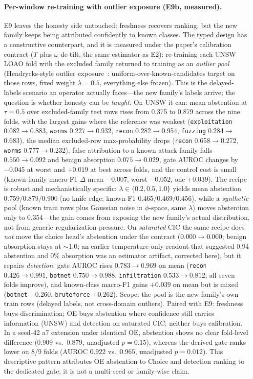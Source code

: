\documentclass[sigconf,anonymous=false]{acmart}
\begin{document}
\paragraph{Per-window re-training with outlier exposure (E9b, measured).} E9 leaves the honesty side untouched: freshness recovers ranking, but the new family keeps being attributed confidently to known classes. The typed design has a constructive counterpart, and it is measured under the paper's calibration contract ($T$ plus $\omega$ de-tilt, the same estimator as E2): re-training each UNSW LOAO fold with the excluded family returned to training as an \emph{outlier pool} (Hendrycks-style outlier exposure~\cite{hendrycks2019oe}: uniform-over-known-candidates target on those rows, fixed weight $\lambda{=}0.5$, everything else frozen). This is the delayed-labels scenario an operator actually faces---the new family's labels arrive; the question is whether honesty can be \emph{taught}. On UNSW it can: mean abstention at $\tau{=}0.5$ over excluded-family test rows rises from 0.375 to 0.879 across the nine folds, with the largest gains where the reference was weakest (\texttt{exploitation} 0.082$\to$0.883, \texttt{worms} 0.227$\to$0.932, \texttt{recon} 0.282$\to$0.954, \texttt{fuzzing} 0.284$\to$0.683), the median excluded-row max-probability drops (\texttt{recon} 0.658$\to$0.272, \texttt{worms} 0.777$\to$0.232), false attribution to a known attack family falls $0.550\to0.092$ and benign absorption $0.075\to0.029$, gate AUROC changes by $-0.045$ at worst and $+0.019$ at best across folds, and the control cost is small (known-family macro-F1 $\Delta$ mean $-0.007$, worst $-0.052$, one $+0.039$). The recipe is robust and mechanistically specific: $\lambda\in\{0.2,0.5,1.0\}$ yields mean abstention $0.759/0.879/0.900$ (no knife edge; known-F1 $0.465/0.469/0.456$), while a \emph{synthetic} pool (known train rows plus Gaussian noise in $\phi$-space, same $\lambda$) moves abstention only to 0.354---the gain comes from exposing the new family's actual distribution, not from generic regularization pressure. On \emph{saturated} CIC the same recipe does \emph{not} move the choice head's abstention under the contract ($0.000\to0.000$; benign absorption stays at $\sim$1.0; an earlier temperature-only readout that suggested 0.94 abstention and 0\% absorption was an estimator artifact, corrected here), but it repairs \emph{detection}: gate AUROC rises $0.783\to0.969$ on mean (\texttt{recon} $0.426\to0.991$, \texttt{botnet} $0.750\to0.988$, \texttt{infiltration} $0.533\to0.812$; all seven folds improve), and known-class macro-F1 gains $+0.039$ on mean but is mixed (\texttt{botnet} $-0.260$, \texttt{bruteforce} $+0.262$). Scope: the pool is the new family's own train rows (delayed labels, not cross-domain outliers). Paired with E9: freshness buys discrimination; OE buys abstention where confidence still carries information (UNSW) and detection on saturated CIC; neither buys calibration. In a seed-42 a7 extension under identical OE, abstention shows no clear fold-level difference ($0.909$ vs.\ $0.879$, unadjusted $p{=}0.15$), whereas the derived gate ranks lower on 8/9 folds (AUROC $0.922$ vs.\ $0.965$, unadjusted $p{=}0.012$). This descriptive pattern attributes OE abstention to Choice and detection ranking to the dedicated gate; it is not a multi-seed or family-wise claim.


\setlength{\bibsep}{0pt plus 0.3ex}

\end{document}
